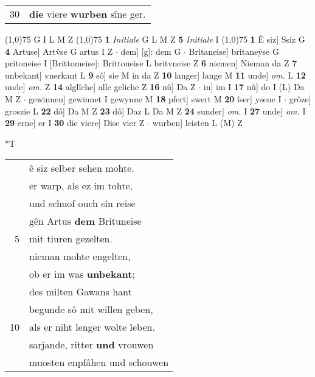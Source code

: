 \documentclass[8pt,a4paper,notitlepage]{article}
\begin{document}
\begin{table}[ht]
\begin{minipage}[t]{0.5\linewidth}
\begin{tabular}{rl}
30 & \textbf{die} viere \textbf{wurben} sîne ger.\\ 
\end{tabular}
\scriptsize
\line(1,0){75} \newline
G I L M Z \newline
\line(1,0){75} \newline
\textbf{1} \textit{Initiale} G L M Z  \textbf{5} \textit{Initiale} I  \newline
\line(1,0){75} \newline
\textbf{1} Ê siz] Ssiz G \textbf{4} Artuse] Artv̂se G artus I Z  $\cdot$ dem] [g]: dem G  $\cdot$ Britaneise] britaneẏse G pritoneise I [Brittomeise]: Brittoneise L britvneise Z \textbf{6} niemen] Nieman da Z \textbf{7} unbekant] vnerkant L \textbf{9} sô] sie M in da Z \textbf{10} langer] lange M \textbf{11} unde] \textit{om.} L \textbf{12} unde] \textit{om.} Z \textbf{14} alglîche] alle geliche Z \textbf{16} nû] Da Z  $\cdot$ in] im I \textbf{17} nû] do I (L) Da M Z  $\cdot$ gewinnen] gewinnet I gewynne M \textbf{18} pfert] swert M \textbf{20} îser] ysene I  $\cdot$ grôze] groszie L \textbf{22} dô] Da M Z \textbf{23} dô] Daz L Da M Z \textbf{24} sunder] \textit{om.} I \textbf{27} unde] \textit{om.} I \textbf{29} erne] er I \textbf{30} die viere] Dise vier Z  $\cdot$ wurben] leisten L (M) Z \newline
\end{minipage}
\hspace{0.5cm}
\begin{minipage}[t]{0.5\linewidth}
\small
\begin{center}*T
\end{center}
\begin{tabular}{rl}
 & ê siz selber sehen mohte.\\ 
 & er warp, als ez im tohte,\\ 
 & und schuof ouch sîn reise\\ 
 & gên Artus \textbf{dem} Brituneise\\ 
5 & mit tiuren gezelten.\\ 
 & nieman mohte engelten,\\ 
 & ob er im was \textbf{unbekant};\\ 
 & des milten Gawans hant\\ 
 & begunde sô mit willen geben,\\ 
10 & als er niht lenger wolte leben.\\ 
 & sarjande, ritter \textbf{und} vrouwen\\ 
 & muosten enpfâhen und schouwen\\ 

\end{tabular}
\end{minipage}
\end{table}
\end{document}
